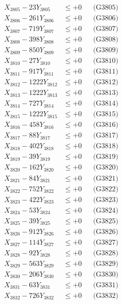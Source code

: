 \documentclass[a4paper,10pt]{article}
\begin{document}
{\begin{align}
X_{3805} - 23Y_{3805} &\leq +0 && \text{(G3805)} \\
X_{3806} - 261Y_{3806} &\leq +0 && \text{(G3806)} \\
X_{3807} - 719Y_{3807} &\leq +0 && \text{(G3807)} \\
X_{3808} - 398Y_{3808} &\leq +0 && \text{(G3808)} \\
X_{3809} - 850Y_{3809} &\leq +0 && \text{(G3809)} \\
X_{3810} - 27Y_{3810} &\leq +0 && \text{(G3810)} \\
\allowbreak
X_{3811} - 917Y_{3811} &\leq +0 && \text{(G3811)} \\
X_{3812} - 1222Y_{3812} &\leq +0 && \text{(G3812)} \\
X_{3813} - 1222Y_{3813} &\leq +0 && \text{(G3813)} \\
X_{3814} - 727Y_{3814} &\leq +0 && \text{(G3814)} \\
X_{3815} - 1222Y_{3815} &\leq +0 && \text{(G3815)} \\
X_{3816} - 458Y_{3816} &\leq +0 && \text{(G3816)} \\
X_{3817} - 88Y_{3817} &\leq +0 && \text{(G3817)} \\
X_{3818} - 402Y_{3818} &\leq +0 && \text{(G3818)} \\
X_{3819} - 39Y_{3819} &\leq +0 && \text{(G3819)} \\
X_{3820} - 162Y_{3820} &\leq +0 && \text{(G3820)} \\
\allowbreak
X_{3821} - 84Y_{3821} &\leq +0 && \text{(G3821)} \\
X_{3822} - 752Y_{3822} &\leq +0 && \text{(G3822)} \\
X_{3823} - 422Y_{3823} &\leq +0 && \text{(G3823)} \\
X_{3824} - 53Y_{3824} &\leq +0 && \text{(G3824)} \\
X_{3825} - 39Y_{3825} &\leq +0 && \text{(G3825)} \\
X_{3826} - 912Y_{3826} &\leq +0 && \text{(G3826)} \\
X_{3827} - 114Y_{3827} &\leq +0 && \text{(G3827)} \\
X_{3828} - 92Y_{3828} &\leq +0 && \text{(G3828)} \\
X_{3829} - 563Y_{3829} &\leq +0 && \text{(G3829)} \\
X_{3830} - 206Y_{3830} &\leq +0 && \text{(G3830)} \\
\allowbreak
X_{3831} - 63Y_{3831} &\leq +0 && \text{(G3831)} \\
X_{3832} - 726Y_{3832} &\leq +0 && \text{(G3832)} \\

\end{align}}
\end{document}
